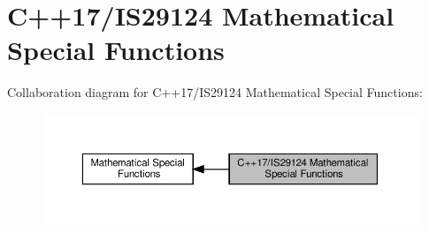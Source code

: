 \hypertarget{group__mathsf__std}{}\section{C++17/\+I\+S29124 Mathematical Special Functions}
\label{group__mathsf__std}
Collaboration diagram for C++17/\+I\+S29124 Mathematical Special Functions\+:
\nopagebreak
\begin{figure}[H]
\begin{center}
\leavevmode
\includegraphics[width=350pt]{group__mathsf__std}
\end{center}
\end{figure}
